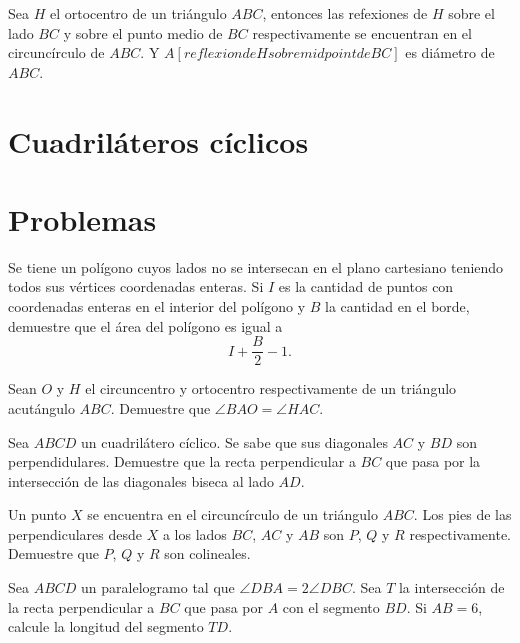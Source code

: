 \begin{lemma}
	Sea $H$ el ortocentro de un triángulo $ABC$, entonces las
	refexiones de $H$ sobre el lado $BC$ y sobre el punto medio de $BC$
	respectivamente se encuentran en el circuncírculo de $ABC$.
	Y $A[reflexion de H sobre midpoint de BC]$ es diámetro de
	$ABC$.
\end{lemma}

\section{Cuadriláteros cíclicos}



\section{Problemas}
\begin{problem}
Se tiene un polígono cuyos lados no se intersecan
en el plano cartesiano
teniendo todos  sus vértices coordenadas enteras.
Si $I$ es la cantidad de puntos
con coordenadas enteras en el interior del polígono
y $B$ la cantidad
en el borde, demuestre que el área del polígono
es igual a
\[I + \frac{B}2 - 1.\]
\end{problem}

\begin{problem}
Sean $O$ y $H$ el circuncentro y ortocentro respectivamente de
un triángulo acutángulo $ABC$.
Demuestre que $\angle BAO = \angle HAC$.
\end{problem}

\begin{problem}
Sea $ABCD$ un cuadrilátero cíclico. Se sabe que
sus diagonales $AC$ y $BD$ son perpendidulares. Demuestre que la recta
perpendicular a $BC$ que pasa por la intersección de las diagonales biseca
al lado $AD$.
\end{problem}

\begin{problem}
Un punto $X$ se encuentra en el circuncírculo de un triángulo $ABC$. Los pies de las perpendiculares
desde $X$ a los lados $BC$, $AC$ y $AB$ son $P$, $Q$ y $R$ respectivamente. Demuestre que $P$, $Q$ y $R$
son colineales.
\end{problem}

\begin{problem}
Sea $ABCD$ un paralelogramo tal que $\angle DBA = 2\angle DBC$. Sea $T$ la intersección
de la recta perpendicular a $BC$ que pasa por $A$ con el segmento $BD$. Si
$AB = 6$, calcule la longitud del segmento $TD$.
\end{problem}

